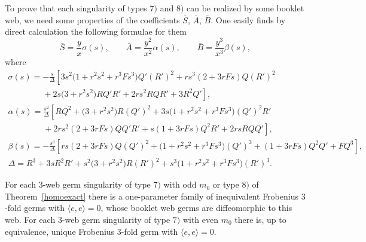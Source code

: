 \documentclass[pdftex]{sigma}
\begin{document}
To prove that each singularity of types $7)$ and $8)$ can be realized by some booklet web,
we need some properties of the coef\/f\/icients $\bar{S}$, $\bar{A}$, $\bar{B}$.
One easily f\/inds by direct calculation the following formulae for them
\begin{equation}\label{SAB}
\bar{S}=\frac{y}{x}\sigma(s), \qquad \bar{A}=\frac{y^2}{x^2}\alpha(s), \qquad \bar{B}=\frac{y^3}{x^3}\beta(s),
\end{equation}
where
\begin{gather}
\sigma(s)=-\frac{s}{\Delta}\left[3s^2\big(1+r^2s^2+r^3Fs^3\big)Q'(R')^2+rs^3(2+3rFs)Q(R')^2\right.\nonumber\\
\left. \phantom{\sigma(s)=}{} +2s\big(3+r^2s^2\big)RQ'R'+2rs^2RQR'+3R^2Q'\right],\nonumber\\
\alpha(s)=\frac{s^2}{\Delta} \left[RQ^2+\big(3+r^2s^2\big)R(Q')^2+3s\big(1+r^2s^2+r^3Fs^3\big)(Q')^2R'\right.\nonumber\\
\left. \phantom{\alpha(s)=}{} +2rs^2(2+3rFs)QQ'R'+s(1+3rFs)Q^2R'+2rsRQQ'\right],\nonumber\\
\beta(s)=-\frac{s^3}{\Delta} \left[ rs(2+3rFs)Q(Q')^2+\big(1+r^2s^2+r^3Fs^3\big)(Q')^3+(1+3rFs)Q^2Q'+FQ^3\right],\nonumber\\
\Delta=R^3+3sR^2R'+s^2\big(3+r^2s^2\big)R(R')^2+s^3\big(1+r^2s^2+r^3Fs^3\big)(R')^3.\label{sab}
\end{gather}
\begin{proposition}
For each $3$-web germ singularity of type $7)$ with odd $m_0$ or type $8)$ of Theorem~{\rm\ref{homoexact}}
there is a one-parameter family of inequivalent Frobenius $3$-fold germs with $\langle e,e\rangle =0$, whose booklet web germs are diffeomorphic to this web. For each $3$-web germ singularity of type $7)$ with even $m_0$ there is, up to equivalence, unique Frobenius $3$-fold germ with $\langle e,e\rangle =0$.
\end{proposition}
\end{document}
